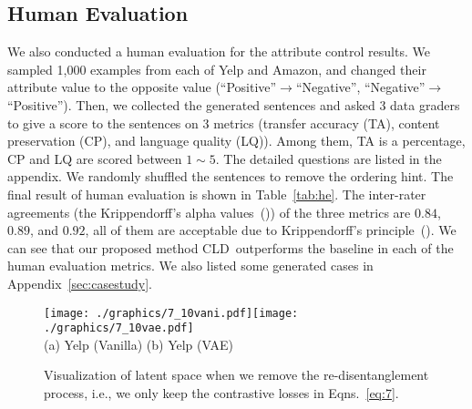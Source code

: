 \documentclass[11pt,a4paper]{article}
\newcommand{\Mname}{CLD}
\begin{document}
\subsection{Human Evaluation}
We also conducted a human evaluation for the attribute control results. We sampled 1,000 examples from each of Yelp and Amazon, and changed their attribute value to the opposite value (``Positive''$\rightarrow$``Negative'', ``Nega\-ti\-ve''$\rightarrow$``Positive''). Then, we collected the generated sentences and asked 3 data graders to give a score to the sentences on 3 metrics (transfer accuracy (TA), content preservation (CP), and language quality (LQ)). Among them, TA is a percentage, CP and LQ are scored between $1\sim 5$. The detailed questions are listed in the appendix. We randomly shuffled  the sentences to remove the ordering hint. The final result of human evaluation is shown in Table~\ref{tab:he}. The inter-rater agreements
(the Krippendorff’s alpha values~(\citeyear{krippendorff2004content})) of the three metrics are $0.84$, $0.89$, and $0.92$, all of them are acceptable due to  Krippendorff’s
principle~(\citeyear{krippendorff2004content}). We can see that  our proposed method \Mname\ outperforms the baseline in each of the human evaluation metrics. We also listed some generated cases in Appendix~\ref{sec:casestudy}.
   
\begin{figure}[!t]
\centering
\texttt{[image: ./graphics/7\_10vani.pdf]}\!\!\!\!\!\!\texttt{[image: ./graphics/7\_10vae.pdf]}\!\!\!\!\!\!\\
(a) Yelp (Vanilla) \qquad (b) Yelp (VAE)\\
\caption{Visualization of latent space when we remove the re-disentanglement  process, i.e., we only keep the contrastive losses in Eqns.~\ref{eq:7}. }
\label{tab:7_10}
\end{figure}
\end{document}
